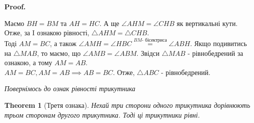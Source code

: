 \documentclass[a4paper, 10pt]{article}
\makeatletter
\def\qed{$\blacksquare$}
\theoremstyle{theoremdd}
\newtheorem{theorem}{Theorem}[subsection]
\theoremstyle{theoremdd}
\theoremstyle{theoremdd}
\theoremstyle{theoremdd}
\theoremstyle{theoremdd}
\theoremstyle{theoremdd}
\theoremstyle{theoremdd}
\theoremstyle{theoremdd}
\theoremstyle{theoremdd}
\renewenvironment{proof}[1][Proof.\\]{\par
\pushQED{\hfill \qed}%
\normalfont \topsep6\p@\@plus6\p@\relax
\trivlist
\item\relax
{\bfseries
#1\@addpunct{.}}\hspace\labelsep\ignorespaces
}{%
\popQED\endtrivlist\@endpefalse
}
\makeatother
\begin{document}
\begin{proof}
\begin{figure}[H]
\end{figure}
Маємо $BH = BM$ та $AH = HC$. А ще $\angle AHM = \angle CHB$ як вертикальні кути. Отже, за I ознакою рівності, $\triangle AHM = \triangle CHB$.\\
Тоді $AM = BC$, а також $\angle AMH = \angle HBC \overset{BM \text{- бісектриса}}{=} \angle ABH$. Якщо подивитись на $\triangle MAB$, то маємо, що $\angle AMB = \angle ABM$. Звідси $\triangle MAB$ - рівнобедрений за ознакою, а тому $AM = AB$.\\
$AM = BC, AM = AB \implies AB = BC$. Отже, $\triangle ABC$ - рівнобедрений.
\end{proof}

\textit{Повернімось до ознак рівності трикутника}

\begin{theorem}[Третя ознака]
Нехай три сторони одного трикутника дорівнюють трьом сторонам другого трикутника. Тоді ці трикутники рівні.
\end{theorem}
\end{document}
